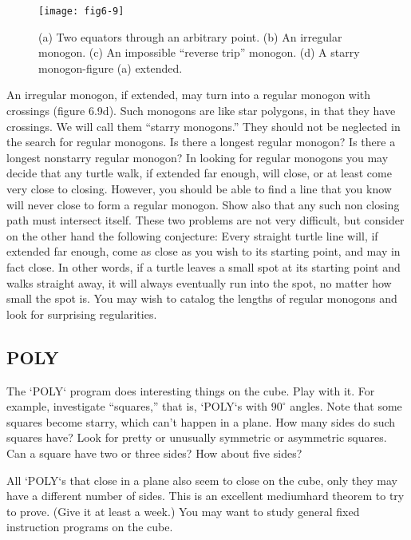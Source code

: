 \documentclass{book}
\begin{document}
\begin{figure}
\begin{center}
\texttt{[image: fig6-9]}
\caption{(a) Two equators through an arbitrary point. (b) An irregular monogon. (c) An impossible ``reverse trip'' monogon. (d) A starry monogon-figure (a) extended.}
\end{center}
\end{figure}

An irregular monogon, if extended, may turn into a regular monogon
with crossings (figure 6.9d). Such monogons are like star polygons, in
that they have crossings. We will call them ``starry monogons.'' They
should not be neglected in the search for regular monogons. Is there a
longest regular monogon? Is there a longest nonstarry regular monogon?
In looking for regular monogons you may decide that any turtle walk,
if extended far enough, will close, or at least come very close to closing.
However, you should be able to find a line that you know will never
close to form a regular monogon. Show also that any such non closing
path must intersect itself. These two problems are not very difficult,
but consider on the other hand the following conjecture: Every straight
turtle line will, if extended far enough, come as close as you wish to its
starting point, and may in fact close. In other words, if a turtle leaves
a small spot at its starting point and walks straight away, it will always
eventually run into the spot, no matter how small the spot is.
You may wish to catalog the lengths of regular monogons and look
for surprising regularities.

\subsection{POLY}

The \textsc{`POLY`} program does interesting things on the cube. Play with it. For
example, investigate ``squares,'' that is, \textsc{`POLY`}s with $90^{\circ}$ angles. Note that
some squares become starry, which can't happen in a plane. How many
sides do such squares have? Look for pretty or unusually symmetric or
asymmetric squares. Can a square have two or three sides? How about
five sides?

All \textsc{`POLY`}s that close in a plane also seem to close on the cube, only
they may have a different number of sides. This is an excellent mediumhard theorem to try to prove. (Give it at least a week.) You may want
to study general fixed instruction programs on the cube.
\end{document}
